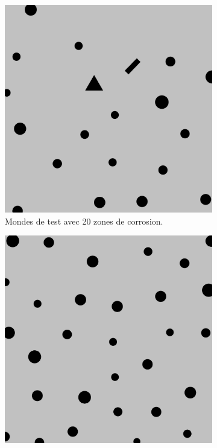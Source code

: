 \documentclass[english,RandD]{rapportPFE}  %
\begin{document}
\begin{figure}[H]
\begin{subfigure}[t]{0.15\linewidth}
				\includegraphics[width=\linewidth]{graphics/test_model_20_1.png}
				\caption{Mondes de test avec 20 zones de corrosion.}
				\label{fig:test_model_20_1}
			\end{subfigure}
			\hfill
			\begin{subfigure}[t]{0.15\linewidth}
				\centering
				\includegraphics[width=\linewidth]{graphics/test_model_30_1.png}

\end{subfigure}
\end{figure}
\end{document}
